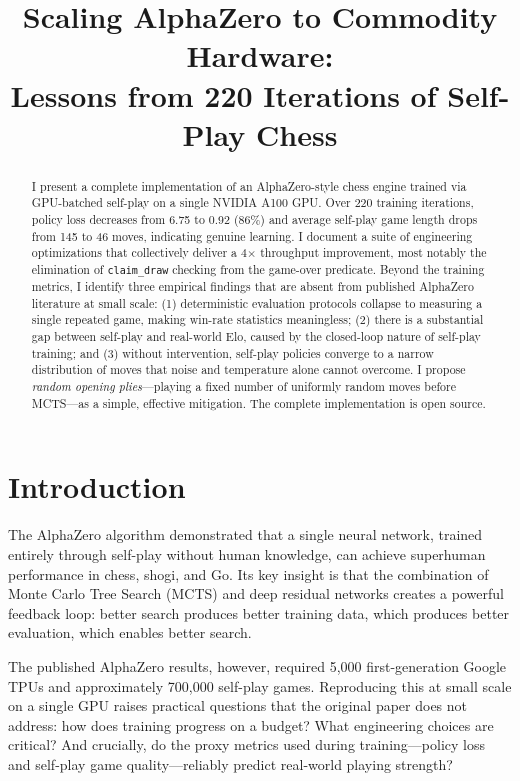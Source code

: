 \documentclass[conference]{IEEEtran}
\title{Scaling AlphaZero to Commodity Hardware:\\
       Lessons from 220 Iterations of Self-Play Chess}
\author{
  \IEEEauthorblockN{Minh Vu}
  \IEEEauthorblockA{Independent Research\\
  \texttt{vuqh@mail.uc.edu}}
}
\begin{document}
\maketitle

\begin{abstract}
I present a complete implementation of an AlphaZero-style chess engine trained
via GPU-batched self-play on a single NVIDIA A100 GPU. Over 220 training
iterations, policy loss decreases from 6.75 to 0.92 (86\%) and average
self-play game length drops from 145 to 46 moves, indicating genuine learning.
I document a suite of engineering optimizations that collectively deliver a
4$\times$ throughput improvement, most notably the elimination of
\texttt{claim\_draw} checking from the game-over predicate.
Beyond the training metrics, I identify three empirical findings that are
absent from published AlphaZero literature at small scale:
(1) deterministic evaluation protocols collapse to measuring a single repeated
game, making win-rate statistics meaningless;
(2) there is a substantial gap between self-play and real-world Elo, caused
by the closed-loop nature of self-play training; and
(3) without intervention, self-play policies converge to a narrow distribution
of moves that noise and temperature alone cannot overcome. I propose
\emph{random opening plies}---playing a fixed number of uniformly random moves
before MCTS---as a simple, effective mitigation. The complete implementation is
open source.
\end{abstract}

\section{Introduction}

The AlphaZero algorithm \cite{silver2017mastering} demonstrated that a single
neural network, trained entirely through self-play without human knowledge,
can achieve superhuman performance in chess, shogi, and Go. Its key insight is
that the combination of Monte Carlo Tree Search (MCTS) \cite{kocsis2006bandit}
and deep residual networks \cite{he2016deep} creates a powerful feedback loop:
better search produces better training data, which produces better evaluation,
which enables better search.

The published AlphaZero results, however, required 5,000 first-generation
Google TPUs and approximately 700,000 self-play games. Reproducing this at
small scale on a single GPU raises practical questions that the original paper
does not address: how does training progress on a budget? What engineering
choices are critical? And crucially, do the proxy metrics used during
training---policy loss and self-play game quality---reliably predict real-world
playing strength?
\end{document}

